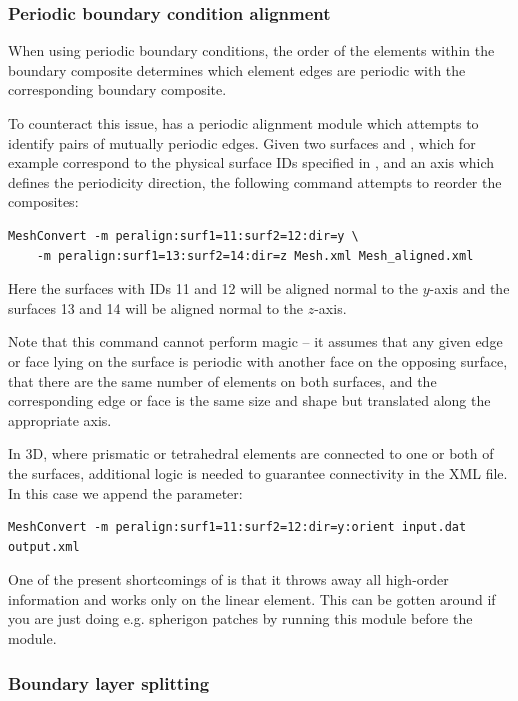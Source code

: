 \subsubsection{Periodic boundary condition alignment}

When using periodic boundary conditions, the order of the elements within the
boundary composite determines which element edges are periodic with the
corresponding boundary composite.

To counteract this issue, \mc has a periodic alignment module which attempts to
identify pairs of mutually periodic edges. Given two surfaces  and
, which for example correspond to the physical surface IDs
specified in \gmsh, and an axis which defines the periodicity direction, the
following command attempts to reorder the composites:
%
\begin{lstlisting}[style=BashInputStyle]
MeshConvert -m peralign:surf1=11:surf2=12:dir=y \
    -m peralign:surf1=13:surf2=14:dir=z Mesh.xml Mesh_aligned.xml
\end{lstlisting}
%
Here the surfaces with IDs 11 and 12 will be aligned normal to the $y$-axis and
the surfaces 13 and 14 will be aligned normal to the $z$-axis.

Note that this command cannot perform magic -- it assumes that any given edge or
face lying on the surface is periodic with another face on the opposing surface,
that there are the same number of elements on both surfaces, and the
corresponding edge or face is the same size and shape but translated along the
appropriate axis.

In 3D, where prismatic or tetrahedral elements are connected to one or both of
the surfaces, additional logic is needed to guarantee connectivity in the XML
file. In this case we append the \inltt{orient} parameter:
%
\begin{lstlisting}[style=BashInputStyle]
MeshConvert -m peralign:surf1=11:surf2=12:dir=y:orient input.dat output.xml
\end{lstlisting}

\begin{notebox}
  One of the present shortcomings of  is that it throws away all
  high-order information and works only on the linear element. This can be
  gotten around if you are just doing e.g. spherigon patches by running this
  \inltt{peralign} module before the \inltt{spherigon} module.
\end{notebox}

\subsubsection{Boundary layer splitting}

